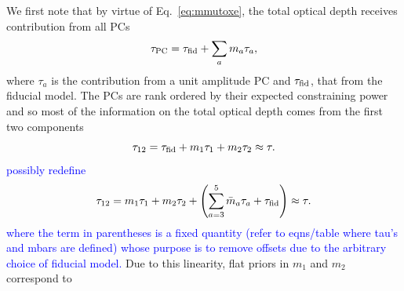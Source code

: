 \documentclass[prd,twocolumn,amsmath,amssymb,floatfix,superscriptaddress,nofootinbib]{revtex4-1}
\newcommand{\beq}{\begin{equation}}
\newcommand{\eeq}{\end{equation}}
\newcommand{\wh}[1]{\textcolor{blue}{#1}}
\begin{document}
 We first note that by virtue of Eq.~\ref{eq:mmutoxe}, the total optical depth receives contribution from all PCs
\beq
\tau_{\rm PC} = \tau_{\rm fid} + \sum_a m_a \tau_a,
\eeq
where $\tau_a$ is the contribution from a unit amplitude PC and $\tau_{\rm fid}$, that from the fiducial model.
The PCs are rank ordered by their expected constraining power and so most of the information on the total optical depth comes from
the first two components
\beq
\tau_{12} = \tau_{\rm fid} + m_1 \tau_1 + m_2 \tau_2 \approx \tau.
\eeq
\wh{possibly redefine
\beq
\tau_{12} =  m_1 \tau_1 + m_2 \tau_2 +
\left(\sum_{a=3}^5 \bar m_a \tau_a + \tau_{\rm fid}\right) \approx \tau.
\eeq
where the term in parentheses is a fixed quantity (refer to eqns/table where tau's and mbars are defined) whose purpose is to remove offsets due to the arbitrary choice of fiducial model.
}
%
%
Due to this linearity, flat priors in $m_1$ and $m_2$ correspond to
\end{document}
